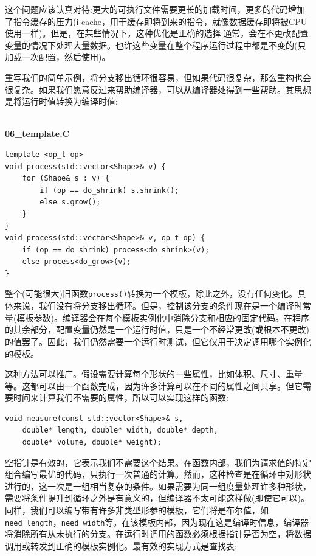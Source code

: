 这个问题应该认真对待:更大的可执行文件需要更长的加载时间，更多的代码增加了指令缓存的压力(i-cache，用于缓存即将到来的指令，就像数据缓存即将被CPU使用一样)。但是，在某些情况下，这种优化是正确的选择:通常，会在不更改配置变量的情况下处理大量数据。也许这些变量在整个程序运行过程中都是不变的(只加载一次配置，然后使用)。 

重写我们的简单示例，将分支移出循环很容易，但如果代码很复杂，那么重构也会很复杂。如果我们愿意反过来帮助编译器，可以从编译器处得到一些帮助。其思想是将运行时值转换为编译时值:

\hspace*{\fill} \\ %
\noindent
\textbf{06\_template.C}
\begin{lstlisting}[style=styleCXX]
template <op_t op>
void process(std::vector<Shape>& v) {
	for (Shape& s : v) {
		if (op == do_shrink) s.shrink();
		else s.grow();
	}
}
void process(std::vector<Shape>& v, op_t op) {
	if (op == do_shrink) process<do_shrink>(v);
	else process<do_grow>(v);
}
\end{lstlisting}

整个(可能很大)旧函数\texttt{process()}转换为一个模板，除此之外，没有任何变化。具体来说，我们没有将分支移出循环。但是，控制该分支的条件现在是一个编译时常量(模板参数)。编译器会在每个模板实例化中消除分支和相应的固定代码。在程序的其余部分，配置变量仍然是一个运行时值，只是一个不经常更改(或根本不更改)的值罢了。因此，我们仍然需要一个运行时测试，但它仅用于决定调用哪个实例化的模板。

这种方法可以推广。假设需要计算每个形状的一些属性，比如体积、尺寸、重量等。这都可以由一个函数完成，因为许多计算可以在不同的属性之间共享。但它需要时间来计算我们不需要的属性，所以可以实现这样的函数:

\begin{lstlisting}[style=styleCXX]
void measure(const std::vector<Shape>& s,
	double* length, double* width, double* depth,
	double* volume, double* weight);
\end{lstlisting}

空指针是有效的，它表示我们不需要这个结果。在函数内部，我们为请求值的特定组合编写最优的代码，只执行一次普通的计算。然而，这种检查是在循环中对形状进行的，这一次是一组相当复杂的条件。如果需要为同一组度量处理许多种形状，需要将条件提升到循环之外是有意义的，但编译器不太可能这样做(即使它可以)。同样，我们可以编写带有许多非类型形参的模板，它们将是布尔值，如\texttt{need\_length}，\texttt{need\_width}等。在该模板内部，因为现在这是编译时信息，编译器将消除所有从未执行的分支。在运行时调用的函数必须根据指针是否为空，将数据调用或转发到正确的模板实例化。最有效的实现方式是查找表:

